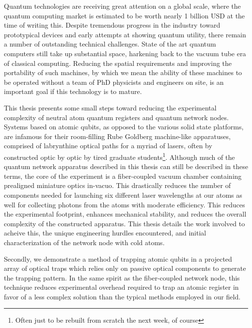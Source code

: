 
\vcinfo{}


Quantum technologies are receiving great attention on a global scale, where the quantum computing market is estimated to be worth nearly 1 billion USD\cite{FortuneBusinessInsights2024} at the time of writing this. Despite tremendous progress in the industry toward prototypical devices and early attempts at showing quantum utility, there remain a number of outstanding technical challenges. State of the art quantum computers still take up substantial space, harkening back to the vacuum tube era of classical computing. Reducing the spatial requirements and improving the portability of such machines, by which we mean the ability of these machines to be operated without a team of PhD physicists and engineers on site, is an important goal if this technology is to mature.

This thesis presents some small steps toward reducing the experimental complexity of neutral atom quantum registers and quantum network nodes. Systems based on atomic qubits, as opposed to the various solid state platforms, are infamous for their room-filling Rube Goldberg machine-like apparatuses, comprised of labrynthine optical paths for a myriad of lasers, often by constructed optic by optic by tired graduate students\footnote{Often just to be rebuilt from scratch the next week, of course}. Although much of the quantum network apparatus described in this thesis can still be described in these terms, the core of the experiment is a fiber-coupled vacuum chamber containing prealigned miniature optics in-vacuo. This drastically reduces the number of components needed for launching six different laser wavelengths at our atoms as well for collecting photons from the atoms with moderate efficiency. This reduces the experimental footprint, enhances mechanical stability, and reduces the overall complexity of the constructed apparatus. This thesis details the work involved to acheive this, the unique engineering hurdles encountered, and initial characterization of the network node with cold atoms. 

Secondly, we demonstrate a method of trapping atomic qubits in a projected array of optical traps which relies only on passive optical components to generate the trapping pattern. In the same spirit as the fiber-coupled network node, this technique reduces experimental overhead required to trap an atomic register in favor of a less complex solution than the typical methods employed in our field. %